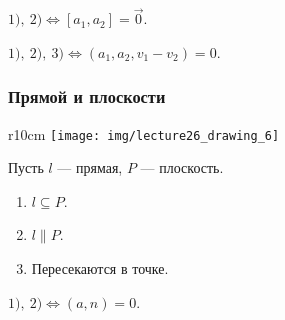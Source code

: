 \medskip
$\hyperref[lec26:l3]{1)}, \ \hyperref[lec26:l4]{2)} \iff [a_1, a_2] = \overrightarrow{0}$.

$\hyperref[lec26:l3]{1)}, \ \hyperref[lec26:l4]{2)}, \ \hyperref[lec26:l5]{3)} \iff (a_1, a_2, v_1 - v_2) = 0$.


\subsubsection{Прямой и плоскости}

\begin{wrapfigure}{r}{10cm}
    \vspace{-20pt}
    \texttt{[image: img/lecture26\_drawing\_6]}
    \vspace{-110pt}
\end{wrapfigure}

Пусть $l$ --- прямая, $P$ --- плоскость.

\begin{enumerate}[nosep]
    \item \label{lec26:l6} $l \subseteq P$.
    \item \label{lec26:l7} $l \parallel P$.
    \item Пересекаются в точке.
\end{enumerate}

\medskip
$\hyperref[lec26:l6]{1)}, \ \hyperref[lec26:l7]{2)} \iff (a, n) = 0$.
